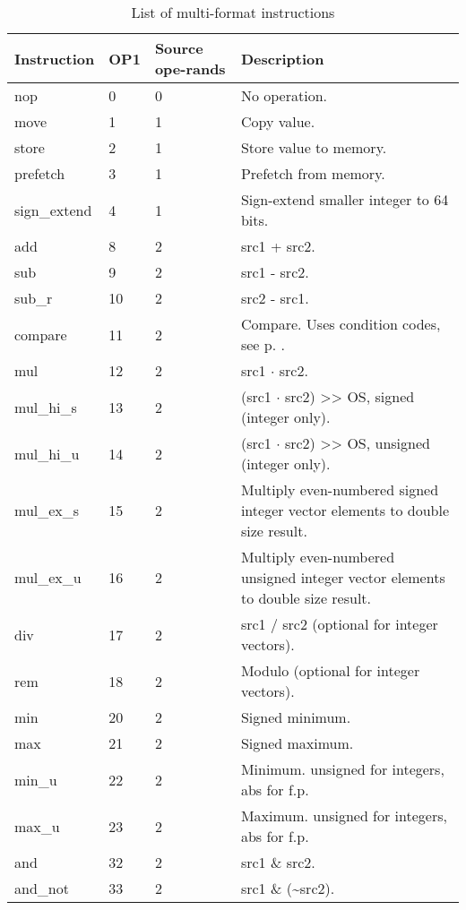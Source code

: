 \documentclass[forwardcom.tex]{subfiles}
\begin{document}
\begin{longtable} {|p{18mm}|p{9mm}|p{9mm}|p{76mm}|}
\caption{
List of multi-format instructions} 
\label{table:ListOfMultiFormatInstructions} \\
\endfirsthead
\endhead
\hline
\bfseries Instruction & \bfseries OP1 & \bfseries Source ope-rands & \bfseries Description \\
\hline
nop          &  0 & 0 & No operation. \\
move         &  1 & 1 & Copy value. \\
store        &  2 & 1 & Store value to memory. \\
prefetch     &  3 & 1 & Prefetch from memory. \\
sign\_extend &  4 & 1 & Sign-extend smaller integer to 64 bits. \\
add          &  8 & 2 & src1 + src2. \\
sub          &  9 & 2 & src1 - src2. \\
sub\_r       & 10 & 2 & src2 - src1. \\
compare      & 11 & 2 & Compare. Uses condition codes, see p. \pageref{table:conditionCodesForCompareInstruction}. \\
mul          & 12 & 2 & src1 $\cdot$ src2. \\ 
mul\_hi\_s   & 13 & 2 & (src1 $\cdot$ src2) \textgreater\textgreater{} OS, signed (integer only). \\
mul\_hi\_u   & 14 & 2 & (src1 $\cdot$ src2) \textgreater\textgreater{}  OS, unsigned (integer only). \\
mul\_ex\_s   & 15 & 2 & Multiply even-numbered signed integer vector elements to double size result. \\
mul\_ex\_u   & 16 & 2 & Multiply even-numbered unsigned integer vector elements to double size result. \\
div          & 17 & 2 & src1 / src2 (optional for integer vectors). \\
rem          & 18 & 2 & Modulo (optional for integer vectors). \\
min          & 20 & 2 & Signed minimum. \\
max          & 21 & 2 & Signed maximum. \\
min\_u       & 22 & 2 & Minimum. unsigned for integers, abs for f.p. \\
max\_u       & 23 & 2 & Maximum. unsigned for integers, abs for f.p. \\
and          & 32 & 2 & src1 \& src2. \\
and\_not     & 33 & 2 & src1 \& (\~{}src2). \\

\end{longtable}
\end{document}
